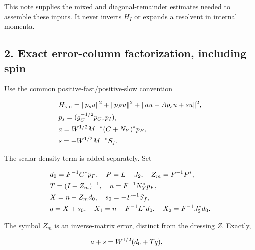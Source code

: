 This note supplies the mixed and diagonal-remainder estimates needed to
assemble these inputs. It never inverts \(H_{I}\) or expands a resolvent
in internal momenta.

\subsection{2. Exact error-column factorization, including
spin}\label{i-exact-error-column-factorization-including-spin}

Use the common positive-fast/positive-slow convention

\begin{gather*}
\begin{aligned}
& H_{\mathrm{kin}} = \Vert p_{s} u\Vert ^{2}+\Vert p_{F} u\Vert ^{2}+\Vert a u+A p_{s} u+s u\Vert ^{2}, \\
& p_{s}=(g_{C}^{-1/2}p_{C},p_{I}), \\
& a=W^{1/2}M^{-*} (C+N_{Y})^{*}p_{F}, \\
& s=-W^{1/2}M^{-*}S_{f}.
\end{aligned}\notag
\end{gather*}

The scalar density term is added separately. Set

\begin{gather*}
\begin{aligned}
& d_{0}=F^{-1}C^{*}p_{F}, \quad  P=L-J_{2}, \quad  Z_{m}=F^{-1}P^{*}, \\
& T=(I+Z_{m})^{-1}, \quad  n=F^{-1}N_{Y}^{*}p_{F}, \\
& X=n-Z_{m} d_{0}, \quad  s_{0}=-F^{-1}S_{f}, \\
& q=X+s_{0}, \quad  X_{1}=n-F^{-1}L^{*}d_{0}, \quad  X_{2}=F^{-1}J_{2}^{*}d_{0}.
\end{aligned}\notag
\end{gather*}

The symbol \(Z_{m}\) is an inverse-matrix error, distinct from the
dressing \(Z\). Exactly,

\begin{gather*}
\begin{aligned}
& a+s = W^{1/2}(d_{0}+Tq),
\end{aligned}\notag
\end{gather*}

